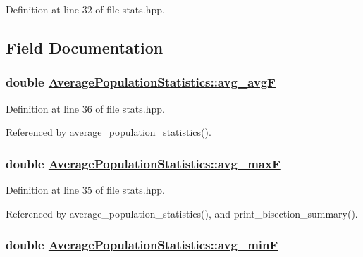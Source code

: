 Definition at line 32 of file stats.hpp.

\subsection{Field Documentation}
\hypertarget{struct_average_population_statistics_b1934683b4113985dc3b08b2abc8cc34}{
\subsubsection[avg\_\-avgF]{\setlength{\rightskip}{0pt plus 5cm}double \hyperlink{struct_average_population_statistics_b1934683b4113985dc3b08b2abc8cc34}{Average\-Population\-Statistics::avg\_\-avg\-F}}}
\label{struct_average_population_statistics_b1934683b4113985dc3b08b2abc8cc34}




Definition at line 36 of file stats.hpp.

Referenced by average\_\-population\_\-statistics().\hypertarget{struct_average_population_statistics_d270701a3171454454a071b48bcd4eff}{
\subsubsection[avg\_\-maxF]{\setlength{\rightskip}{0pt plus 5cm}double \hyperlink{struct_average_population_statistics_d270701a3171454454a071b48bcd4eff}{Average\-Population\-Statistics::avg\_\-max\-F}}}
\label{struct_average_population_statistics_d270701a3171454454a071b48bcd4eff}




Definition at line 35 of file stats.hpp.

Referenced by average\_\-population\_\-statistics(), and print\_\-bisection\_\-summary().\hypertarget{struct_average_population_statistics_eb91d551ff5f30d3001cbace5e0ff8ac}{
\subsubsection[avg\_\-minF]{\setlength{\rightskip}{0pt plus 5cm}double \hyperlink{struct_average_population_statistics_eb91d551ff5f30d3001cbace5e0ff8ac}{Average\-Population\-Statistics::avg\_\-min\-F}}}
\label{struct_average_population_statistics_eb91d551ff5f30d3001cbace5e0ff8ac}




